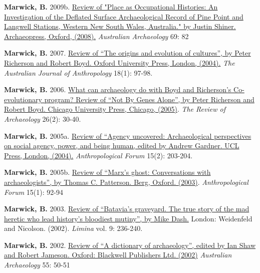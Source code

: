 \documentclass[11pt,article,oneside]{memoir}
\begin{document}
{{{\ind \textbf{Marwick, B.} 2009b. \href{http://faculty.washington.edu/bmarwick/PDFs/Marwick_2009_Shiner_review.pdf}{Review of "Place as Occupational Histories: An Investigation of the Deflated Surface Archaeological Record of Pine Point and Langwell Stations, Western New South Wales, Australia." by Justin Shiner. Archaeopress, Oxford, (2008).} \textit{Australian Archaeology} 69: 82

\ind \textbf{Marwick, B.} 2007. \href{http://faculty.washington.edu/bmarwick/PDFs/Evolution.pdf}{Review of “The origins and evolution of cultures”, by Peter Richerson and Robert Boyd. Oxford University Press, London, (2004).} \textit{The Australian Journal of Anthropology} 18(1): 97-98.

\ind \textbf{Marwick, B.} 2006. \href{http://faculty.washington.edu/bmarwick/PDFs/Marwick_2006_[B&R].pdf}{What can archaeology do with Boyd and Richerson’s Co-evolutionary program? Review of “Not By Genes Alone”, by Peter Richerson and Robert Boyd. Chicago University Press, Chicago, (2005)}. \textit{The Review of Archaeology} 26(2): 30-40.

\ind \textbf{Marwick, B.} 2005a. \href{http://faculty.washington.edu/bmarwick/PDFs/Uncovered.pdf}{Review of “Agency uncovered: Archaeological perspectives on social agency, power, and being human, edited by Andrew Gardner. UCL Press, London, (2004).} \textit{Anthropological Forum} 15(2): 203-204.

\ind \textbf{Marwick, B.} 2005b. \href{http://faculty.washington.edu/bmarwick/PDFs/Ghosts.pdf}{Review of “Marx’s ghost: Conversations with archaeologists”, by Thomas C. Patterson. Berg, Oxford. (2003)}. \textit{Anthropological Forum} 15(1): 92-94

\ind \textbf{Marwick, B.} 2003. \href{http://faculty.washington.edu/bmarwick/PDFs/Batavia.pdf}{Review of “Batavia’s graveyard. The true story of the mad heretic who lead history’s bloodiest mutiny”, by Mike Dash.} London: Weidenfeld and Nicolson. (2002). \textit{Limina} vol. 9: 236-240.

\ind \textbf{Marwick, B.} 2002. \href{http://faculty.washington.edu/bmarwick/PDFs/Marwick_2002_Dictionary.pdf}{Review of “A dictionary of archaeology”, edited by Ian Shaw and Robert Jameson. Oxford: Blackwell Publishers Ltd. (2002)} \textit{Australian Archaeology} 55: 50-51

\bigskip

\newpage


}}}
\end{document}
